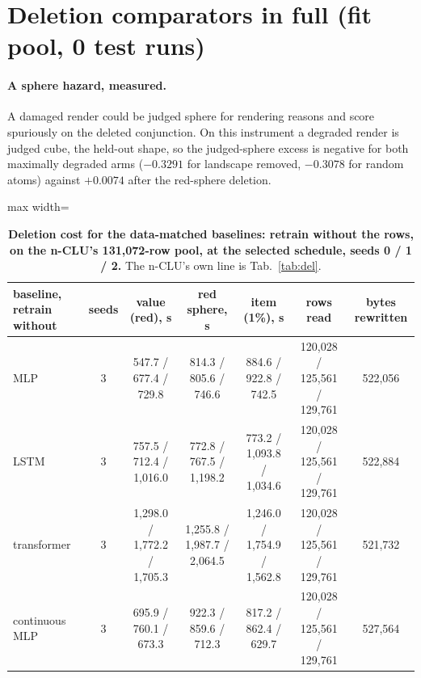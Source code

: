 \documentclass{article} %
\begin{document}
\section{Deletion comparators in full (fit pool, 0 test runs)}
\label{app:delbase}

\paragraph{A sphere hazard, measured.} A damaged render could be judged sphere for rendering
reasons and score spuriously on the deleted conjunction. On this instrument a degraded render
is judged cube, the held-out shape, so the judged-sphere excess is negative for both maximally
degraded arms ($-0.3291$ for landscape removed, $-0.3078$ for
random atoms) against $+0.0074$ after the red-sphere deletion.

\begin{table}[h]
\centering\small
\caption{\textbf{Deletion cost for the data-matched baselines: retrain without the rows, on the n-CLU's %
131,072-row pool, at the selected schedule, seeds 0 / 1 / 2.} The n-CLU's own line is %
Tab.~\ref{tab:del}.}
\label{tab:rivals-del}
\setlength{\tabcolsep}{3pt}
\begin{adjustbox}{max width=\linewidth}\begin{tabular}{lcccccc}
\toprule
baseline, retrain without & seeds & value (red), s & red sphere, s & item (1\%), s & rows read & bytes rewritten \\
\midrule
MLP & 3 & 547.7 / 677.4 / 729.8 & 814.3 / 805.6 / 746.6 & 884.6 / 922.8 / 742.5 & 120,028 / 125,561 / 129,761 & 522,056 \\
LSTM & 3 & 757.5 / 712.4 / 1,016.0 & 772.8 / 767.5 / 1,198.2 & 773.2 / 1,093.8 / 1,034.6 & 120,028 / 125,561 / 129,761 & 522,884 \\
transformer & 3 & 1,298.0 / 1,772.2 / 1,705.3 & 1,255.8 / 1,987.7 / 2,064.5 & 1,246.0 / 1,754.9 / 1,562.8 & 120,028 / 125,561 / 129,761 & 521,732 \\
continuous MLP & 3 & 695.9 / 760.1 / 673.3 & 922.3 / 859.6 / 712.3 & 817.2 / 862.4 / 629.7 & 120,028 / 125,561 / 129,761 & 527,564 \\
\bottomrule
\end{tabular}\end{adjustbox}
\end{table}
\end{document}
